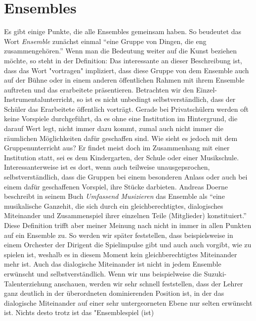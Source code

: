 \section{Ensembles}

Es gibt einige Punkte, die alle Ensembles gemeinsam haben. So beudeutet das Wort
\emph{Ensemble} zunächst einmal \enquote{eine Gruppe von Dingen, die eng zusammengehören.}
Wenn man die Bedeutung weiter auf die Kunst beziehen möchte, so
steht in der Definition: \autocite{eine Gruppe von Künstlern -wie Schauspieler, oder
Musiker, die gemeinsam etwas vortragen.} %
Das interessante
an dieser Beschreibung ist, dass das Wort "vortragen" impliziert, dass diese
Gruppe von dem Ensemble auch auf der Bühne oder in einem anderen öffentlichen
Rahmen mit ihrem Ensemble auftreten und das erarbeitete präsentieren. Betrachten
wir den Einzel- Instrumentalunterricht, so ist es nicht unbedingt
selbstverständlich, dass der Schüler das Erarbeitete öffentlich vorträgt. Gerade
bei Privatschülern werden oft keine Vorspiele durchgeführt, da es ohne eine
Institution im Hintergrund, die darauf Wert legt, nicht immer dazu kommt, zumal
auch nicht immer die räumlichen Möglichkeiten dafür geschaffen sind. Wie sieht
es jedoch mit dem Gruppenunterricht aus? Er findet meist doch im Zusammenhang
mit einer Institution statt, sei es dem Kindergarten, der Schule oder einer
Musikschule. Interessanterweise ist es dort, wenn auch teilweise
unausgepsrochen, selbstverständlich, dass die Gruppen bei einem besonderen
Anlass oder auch bei einem dafür geschaffenen Vorspiel, ihre Stücke darbieten.
Andreas Doerne beschreibt in seinem Buch \emph{Umfassend Musizieren} das
Ensemble als \enquote{eine musikalische Ganzehit, die sich durch ein
gleichberechtigtes, dialogisches Miteinander und Zusammenspiel ihrer einzelnen
Teile (Mitglieder) konstituiert.} \autocite[62]{doerne:umfassend_musizieren}
Diese Definition trifft aber meiner Meinung nach nicht in immer in
allen Punkten auf ein Ensemble zu. So werden wir später feststellen, dass
beispielsweise in einem Orchester der Dirigent die Spielimpulse gibt und auch
auch vorgibt, wie zu spielen ist, weshalb es in diesem Moment kein
gleichberechtigtes Miteinander mehr ist. Auch das dialogische Miteinander ist
nicht in jedem Ensemble erwünscht und selbstverständlich. Wenn wir uns
beispielweise die Suzuki-Talenterziehung anschauen, werden wir sehr schnell
feststellen, dass der Lehrer ganz deutlich in der überordneten dominierenden
Position ist, in der das dialogische Miteinander auf einer sehr untergeorneten
Ebene nur selten erwünscht ist. Nichts desto trotz ist das "Ensemblespiel (ist)
